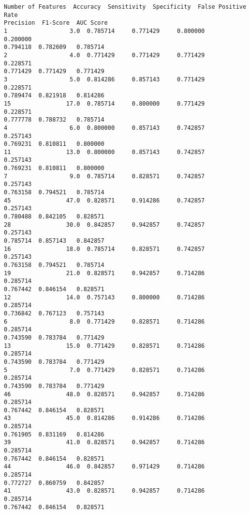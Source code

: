\documentclass[11pt]{article}
\makeatletter
\newcommand{\boxspacing}{\kern\kvtcb@left@rule\kern\kvtcb@boxsep}
\newcommand{\prompt}[4]{
        {\ttfamily\llap{{\color{#2}[#3]:\hspace{3pt}#4}}\vspace{-\baselineskip}}
    }
\makeatother
\begin{document}
            \begin{tcolorbox}[breakable, size=fbox, boxrule=.5pt, pad at break*=1mm, opacityfill=0]
\prompt{Out}{outcolor}{77}{\boxspacing}
\begin{Verbatim}[commandchars=\\\{\}]
    Number of Features  Accuracy  Sensitivity  Specificity  False Positive Rate
Precision  F1-Score  AUC Score
1                  3.0  0.785714     0.771429     0.800000             0.200000
0.794118  0.782609   0.785714
2                  4.0  0.771429     0.771429     0.771429             0.228571
0.771429  0.771429   0.771429
3                  5.0  0.814286     0.857143     0.771429             0.228571
0.789474  0.821918   0.814286
15                17.0  0.785714     0.800000     0.771429             0.228571
0.777778  0.788732   0.785714
4                  6.0  0.800000     0.857143     0.742857             0.257143
0.769231  0.810811   0.800000
11                13.0  0.800000     0.857143     0.742857             0.257143
0.769231  0.810811   0.800000
7                  9.0  0.785714     0.828571     0.742857             0.257143
0.763158  0.794521   0.785714
45                47.0  0.828571     0.914286     0.742857             0.257143
0.780488  0.842105   0.828571
28                30.0  0.842857     0.942857     0.742857             0.257143
0.785714  0.857143   0.842857
16                18.0  0.785714     0.828571     0.742857             0.257143
0.763158  0.794521   0.785714
19                21.0  0.828571     0.942857     0.714286             0.285714
0.767442  0.846154   0.828571
12                14.0  0.757143     0.800000     0.714286             0.285714
0.736842  0.767123   0.757143
6                  8.0  0.771429     0.828571     0.714286             0.285714
0.743590  0.783784   0.771429
13                15.0  0.771429     0.828571     0.714286             0.285714
0.743590  0.783784   0.771429
5                  7.0  0.771429     0.828571     0.714286             0.285714
0.743590  0.783784   0.771429
46                48.0  0.828571     0.942857     0.714286             0.285714
0.767442  0.846154   0.828571
43                45.0  0.814286     0.914286     0.714286             0.285714
0.761905  0.831169   0.814286
39                41.0  0.828571     0.942857     0.714286             0.285714
0.767442  0.846154   0.828571
44                46.0  0.842857     0.971429     0.714286             0.285714
0.772727  0.860759   0.842857
41                43.0  0.828571     0.942857     0.714286             0.285714
0.767442  0.846154   0.828571

\end{Verbatim}
\end{tcolorbox}
\end{document}

